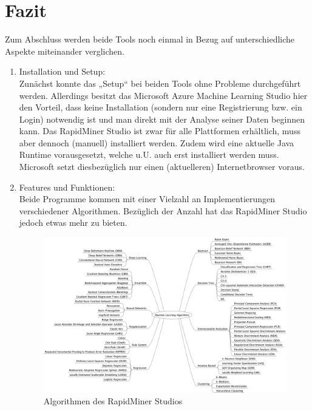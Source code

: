 %


%
%
\chapter{Fazit}
\label{sec:fazit}

Zum Abschluss werden beide Tools noch einmal in Bezug auf unterschiedliche
Aspekte miteinander verglichen.

\begin{enumerate}
  \item Installation und Setup: \\
  Zunächst konnte das „Setup“ bei beiden Tools ohne Probleme durchgeführt
  werden. Allerdings besitzt das Microsoft Azure Machine Learning Studio
  hier den Vorteil, dass keine Installation (sondern nur eine Registrierung
  bzw. ein Login) notwendig ist und man direkt mit der Analyse seiner Daten
  beginnen kann. Das RapidMiner Studio ist zwar für alle Plattformen erhältlich,
  muss aber dennoch (manuell) installiert werden. Zudem wird eine aktuelle Java
  Runtime vorausgesetzt, welche u.U. auch erst installiert werden muss.
  Microsoft setzt diesbezüglich nur einen (aktuelleren) Internetbrowser voraus.
  \item Features und Funktionen: \\
  Beide Programme kommen mit einer Vielzahl an Implementierungen verschiedener
  Algorithmen. Bezüglich der Anzahl hat das RapidMiner Studio jedoch etwas mehr
  zu bieten. 

  \begin{figure}[htb]
    \includegraphics[width=\textwidth]{gfx/rmalgs.png}
    \caption{Algorithmen des RapidMiner Studios \cite{MLM}}
    \label{fig:fazit:rmalgs}
  \end{figure}


\end{enumerate}
